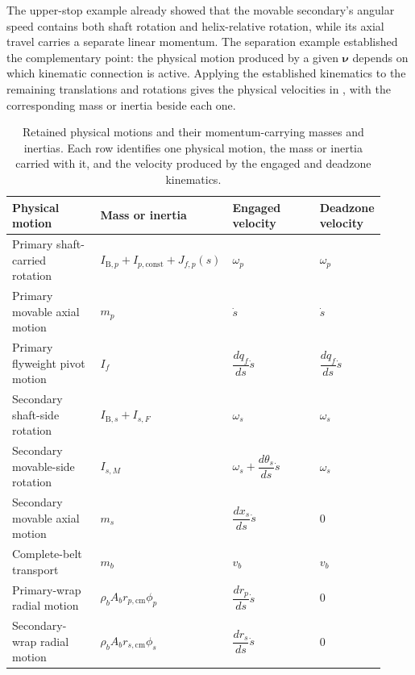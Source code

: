 \documentclass[11pt]{report}
\numberwithin{equation}{section}
\begin{document}
The upper-stop example already showed that the movable secondary's angular
speed contains both shaft rotation and helix-relative rotation, while its
axial travel carries a separate linear momentum. The separation example
established the complementary point: the physical motion produced by a given
\(\boldsymbol{\nu}\) depends on which kinematic connection is active. Applying
the established kinematics to the remaining translations and rotations gives
the physical velocities in , with the
corresponding mass or inertia beside each one.

\begin{table}[H]
    \centering
    \small
    \renewcommand{\arraystretch}{1.35}
    \setlength{\tabcolsep}{4pt}
    \begin{tabular}{@{}
        >{\raggedright\arraybackslash}p{0.25\linewidth}
        >{\centering\arraybackslash}p{0.29\linewidth}
        >{\centering\arraybackslash}p{0.25\linewidth}
        >{\centering\arraybackslash}p{0.13\linewidth}
        @{}}
        \toprule
        \textbf{Physical motion}
        & \textbf{Mass or inertia}
        & \textbf{Engaged velocity}
        & \textbf{Deadzone velocity} \\
        \midrule
        Primary shaft-carried rotation
        & \(I_{\mathrm B,p}+I_{p,\mathrm{const}}+J_{f,p}(s)\)
        & \(\omega_p\)
        & \(\omega_p\) \\[5pt]
        Primary movable axial motion
        & \(m_p\)
        & \(\dot s\)
        & \(\dot s\) \\[5pt]
        Primary flyweight pivot motion
        & \(I_f\)
        & \(\dfrac{dq_f}{ds}\dot s\)
        & \(\dfrac{dq_f}{ds}\dot s\) \\[5pt]
        Secondary shaft-side rotation
        & \(I_{\mathrm B,s}+I_{s,F}\)
        & \(\omega_s\)
        & \(\omega_s\) \\[5pt]
        Secondary movable-side rotation
        & \(I_{s,M}\)
        & \(\omega_s+\dfrac{d\theta_s}{ds}\dot s\)
        & \(\omega_s\) \\[5pt]
        Secondary movable axial motion
        & \(m_s\)
        & \(\dfrac{dx_s}{ds}\dot s\)
        & \(0\) \\[5pt]
        Complete-belt transport
        & \(m_b\)
        & \(v_b\)
        & \(v_b\) \\[5pt]
        Primary-wrap radial motion
        & \(\rho_b A_b r_{p,\mathrm{cm}}\phi_p\)
        & \(\dfrac{dr_p}{ds}\dot s\)
        & \(0\) \\[5pt]
        Secondary-wrap radial motion
        & \(\rho_b A_b r_{s,\mathrm{cm}}\phi_s\)
        & \(\dfrac{dr_s}{ds}\dot s\)
        & \(0\) \\
        \bottomrule
    \end{tabular}
    \caption{Retained physical motions and their momentum-carrying masses
    and inertias. Each row identifies one physical motion, the mass or
    inertia carried with it, and the velocity produced by the engaged
    and deadzone kinematics.}
    \label{tab:finite_event_motion_inventory}
\end{table}
\end{document}
